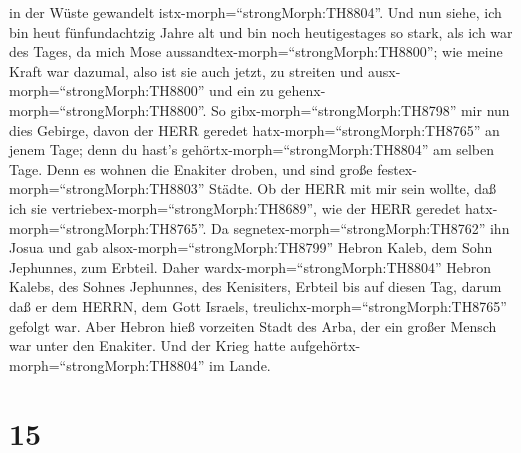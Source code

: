 in der Wüste gewandelt istx-morph=``strongMorph:TH8804''. Und nun siehe,
ich bin heut fünfundachtzig Jahre alt  und bin noch
heutigestages so stark, als ich war des Tages, da mich Mose
aussandtex-morph=``strongMorph:TH8800''; wie meine Kraft war dazumal,
also ist sie auch jetzt, zu streiten und
ausx-morph=``strongMorph:TH8800'' und ein zu
gehenx-morph=``strongMorph:TH8800''.  So
gibx-morph=``strongMorph:TH8798'' mir nun dies Gebirge, davon der HERR
geredet hatx-morph=``strongMorph:TH8765'' an jenem Tage; denn du hast's
gehörtx-morph=``strongMorph:TH8804'' am selben Tage. Denn es wohnen die
Enakiter droben, und sind große festex-morph=``strongMorph:TH8803''
Städte. Ob der HERR mit mir sein wollte, daß ich sie
vertriebex-morph=``strongMorph:TH8689'', wie der HERR geredet
hatx-morph=``strongMorph:TH8765''.  Da
segnetex-morph=``strongMorph:TH8762'' ihn Josua und gab
alsox-morph=``strongMorph:TH8799'' Hebron Kaleb, dem Sohn Jephunnes, zum
Erbteil.  Daher wardx-morph=``strongMorph:TH8804'' Hebron
Kalebs, des Sohnes Jephunnes, des Kenisiters, Erbteil bis auf diesen
Tag, darum daß er dem HERRN, dem Gott Israels,
treulichx-morph=``strongMorph:TH8765'' gefolgt war.  Aber
Hebron hieß vorzeiten Stadt des Arba, der ein großer Mensch war unter
den Enakiter. Und der Krieg hatte
aufgehörtx-morph=``strongMorph:TH8804'' im Lande.

\hypertarget{section-14}{%
\section{15}\label{section-14}}

